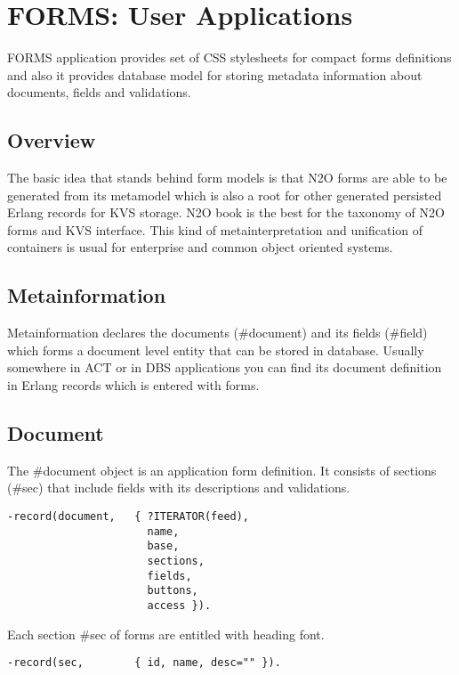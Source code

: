 \section{FORMS: User Applications}
FORMS application provides set of CSS stylesheets for compact forms definitions
and also it provides database model for storing metadata information about
documents, fields and validations.

\subsection{Overview}
The basic idea that stands behind form models is that N2O forms are able to be
generated from its metamodel which is also a root for other generated
persisted Erlang records for KVS storage. N2O book is the best for the taxonomy
of N2O forms and KVS interface. This kind of metainterpretation and unification of
containers is usual for enterprise and common object oriented systems.

\subsection{Metainformation}
Metainformation declares the documents (\#document) and its
fields (\#field) which forms a document level entity that can
be stored in database. Usually somewhere in ACT or in DBS
applications you can find its document definition in Erlang
records which is entered with forms.

\subsection{Document}
The \#document object is an application form definition.
It consists of sections (\#sec) that include fields with
its descriptions and validations.

\vspace{1\baselineskip}
\begin{lstlisting}
-record(document,   { ?ITERATOR(feed),
                      name,
                      base,
                      sections,
                      fields,
                      buttons,
                      access }).
\end{lstlisting}

Each section \#sec of forms are entitled with heading font.

\vspace{1\baselineskip}
\begin{lstlisting}
-record(sec,        { id, name, desc="" }).
\end{lstlisting}

